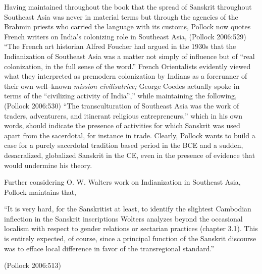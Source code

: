 Having maintained throughout the book that the spread of Sanskrit throughout Southeast Asia was never in material terms but through the agencies of the Brahmin priests who carried the language with its customs, Pollock now quotes French writers on India’s colonizing role in Southeast Asia, (Pollock 2006:529) “The French art historian Alfred Foucher had argued in the 1930s that the Indianization of Southeast Asia was a matter not simply of influence but of “real colonization, in the full sense of the word.” French Orientalists evidently viewed what they interpreted as premodern colonization by Indians as a forerunner of their own well–known \textit{mission civilisatrice;} George Coedes actually spoke in terms of the “civilizing activity of India”,” while maintaining the following, (Pollock 2006:530) “The transculturation of Southeast Asia was the work of traders, adventurers, and itinerant religious entrepreneurs,” which in his own words, should indicate the presence of activities for which Sanskrit was used apart from the sacerdotal, for instance in trade. Clearly, Pollock wants to build a case for a purely sacerdotal tradition based period in the BCE and a sudden, desacralized, globalized Sanskrit in the CE, even in the presence of evidence that would undermine his theory.

Further considering O. W. Walters work on Indianization in Southeast Asia, Pollock maintains that,

\begin{myquote}
“It is very hard, for the Sanskritist at least, to identify the slightest Cambodian inflection in the Sanskrit inscriptions Wolters analyzes beyond the occasional localism with respect to gender relations or sectarian practices (chapter 3.1). This is entirely expected, of course, since a principal function of the Sanskrit discourse was to efface local difference in favor of the transregional standard.”
\end{myquote}

\hfill (Pollock 2006:513)

